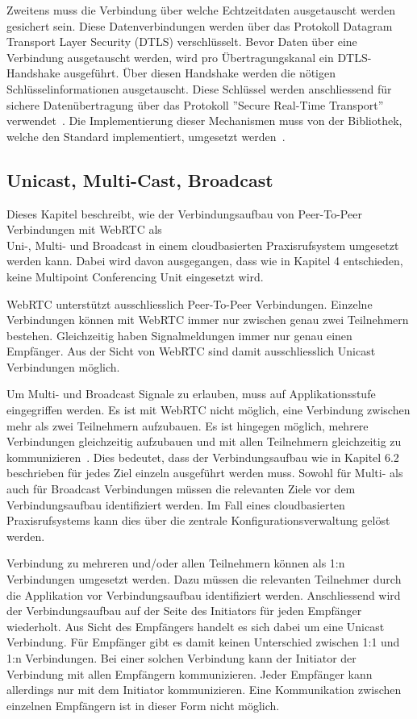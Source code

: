 Zweitens muss die Verbindung über welche Echtzeitdaten ausgetauscht werden gesichert sein.
Diese Datenverbindungen werden über das Protokoll Datagram Transport Layer Security (DTLS) verschlüsselt.
Bevor Daten über eine Verbindung ausgetauscht werden, wird pro Übertragungskanal ein DTLS-Handshake ausgeführt.
Über diesen Handshake werden die nötigen Schlüsselinformationen ausgetauscht.
Diese Schlüssel werden anschliessend für sichere Datenübertragung über das Protokoll ''Secure Real-Time Transport'' verwendet~\cite{rfc_8827_webRTC_SecurityArchitecture}.
Die Implementierung dieser Mechanismen muss von der Bibliothek, welche den Standard implementiert, umgesetzt werden~\cite{webrtc_spec}.

\subsection{Unicast, Multi-Cast, Broadcast}

Dieses Kapitel beschreibt, wie der Verbindungsaufbau von Peer-To-Peer Verbindungen mit WebRTC als \\Uni-, Multi- und Broadcast in einem cloudbasierten Praxisrufsystem umgesetzt werden kann.
Dabei wird davon ausgegangen, dass wie in Kapitel 4 entschieden, keine Multipoint Conferencing Unit eingesetzt wird.

WebRTC unterstützt ausschliesslich Peer-To-Peer Verbindungen.
Einzelne Verbindungen können mit WebRTC immer nur zwischen genau zwei Teilnehmern bestehen.
Gleichzeitig haben Signalmeldungen immer nur genau einen Empfänger.
Aus der Sicht von WebRTC sind damit ausschliesslich Unicast Verbindungen möglich.

Um Multi- und Broadcast Signale zu erlauben, muss auf Applikationsstufe eingegriffen werden.
Es ist mit WebRTC nicht möglich, eine Verbindung zwischen mehr als zwei Teilnehmern aufzubauen.
Es ist hingegen möglich, mehrere Verbindungen gleichzeitig aufzubauen und mit allen Teilnehmern gleichzeitig zu kommunizieren~\cite{webrtc_mesh}.
Dies bedeutet, dass der Verbindungsaufbau wie in Kapitel 6.2 beschrieben für jedes Ziel einzeln ausgeführt werden muss.
Sowohl für Multi- als auch für Broadcast Verbindungen müssen die relevanten Ziele vor dem Verbindungsaufbau identifiziert werden.
Im Fall eines cloudbasierten Praxisrufsystems kann dies über die zentrale Konfigurationsverwaltung gelöst werden.

Verbindung zu mehreren und/oder allen Teilnehmern können als 1:n Verbindungen umgesetzt werden.
Dazu müssen die relevanten Teilnehmer durch die Applikation vor Verbindungsaufbau identifiziert werden.
Anschliessend wird der Verbindungsaufbau auf der Seite des Initiators für jeden Empfänger wiederholt.
Aus Sicht des Empfängers handelt es sich dabei um eine Unicast Verbindung.
Für Empfänger gibt es damit keinen Unterschied zwischen 1:1 und 1:n Verbindungen.
Bei einer solchen Verbindung kann der Initiator der Verbindung mit allen Empfängern kommunizieren.
Jeder Empfänger kann allerdings nur mit dem Initiator kommunizieren.
Eine Kommunikation zwischen einzelnen Empfängern ist in dieser Form nicht möglich.

